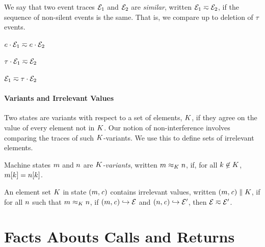 \documentclass[10pt,conference]{ieeetran}%
\theoremstyle{definition}
\begin{document}
We say that two event traces $\mathcal{E}_1$ and $\mathcal{E}_2$ are {\em similar},
written \(\mathcal{E}_1 \eqsim \mathcal{E}_2\), if the sequence of non-silent events
is the same. That is, we compare up to deletion of \(\tau\) events.

\begin{minipage}{.4\columnwidth}
  \judgment{}{\(\obsT \eqsim \obsT\)}
\end{minipage}
\begin{minipage}{.4\columnwidth}
           {\(e \cdot \mathcal{E}_1 \eqsim e \cdot \mathcal{E}_2\)}
\end{minipage}

\begin{minipage}{.4\columnwidth}
           {\(\tau \cdot \mathcal{E}_1 \eqsim \mathcal{E}_2\)}
\end{minipage}
\begin{minipage}{.4\columnwidth}
           {\(\mathcal{E}_1 \eqsim \tau \cdot \mathcal{E}_2\)}
\end{minipage}

\paragraph*{Variants and Irrelevant Values}

Two states are variants with respect to a set of elements, \(K\),
if they agree on the value of every element not in \(K\). Our
notion of non-interference involves comparing the traces of such
\(K\)-variants. We use this to define sets of irrelevant elements.

 Machine states \(m\) and \(n\) are {\em \(K\)-variants},
written \(m \approx_K n\), if, for
all \(k \not \in K\), \(m[k] = n[k]\).

 An element set \(K\) in state \((m,\mathit{c})\) contains
irrelevant values, written \((m,\mathit{c}) \parallel K\), if for all
\(n\) such that \(m \approx_{K} n\), if 
\((m,\mathit{c}) \hookrightarrow \mathcal{E}\) and
\((n,\mathit{c}) \hookrightarrow \mathcal{E}'\), then
\(\mathcal{E} \eqsim \mathcal{E}'\).

\section{Facts Abouts Calls and Returns}
\label{sec:facts}
\end{document}
